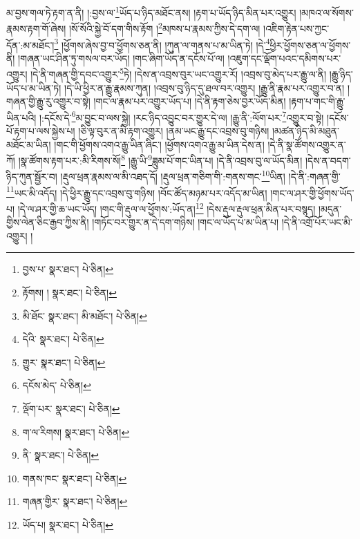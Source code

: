 མ་བྱས་གལ་ཏེ་རྟག་ན་ནི། །:བྱས་ལ་\footnote{བྱས་པ་  སྣར་ཐང་།  པེ་ཅིན། }ཡོད་པ་ཉིད་མཐོང་ནས། །རྟག་པ་ཡོད་ཉིད་མིན་པར་འགྱུར། །མཁའ་ལ་སོགས་རྣམས་རྟག་གོ་ཞེས། །སོ་སོའི་སྐྱེ་བོ་དག་གིས་རྟོག །\footnote{རྟོགས། །  སྣར་ཐང་།  པེ་ཅིན། }མཁས་པ་རྣམས་ཀྱིས་དེ་དག་ལ། །འཇིག་རྟེན་པས་ཀྱང་དོན་:མ་མཐོང་།\footnote{མི་ཐོང་  སྣར་ཐང་། མི་མཐོང་།  པེ་ཅིན། } །ཕྱོགས་ཞེས་བྱ་བ་ཕྱོགས་ཅན་ནི། །ཀུན་ལ་གནས་པ་མ་ཡིན་ཏེ། །དེ་\footnote{དེའི་  སྣར་ཐང་།  པེ་ཅིན། }ཕྱིར་ཕྱོགས་ཅན་ལ་ཕྱོགས་ནི། །གཞན་ཡང་ཤིན་ཏུ་གསལ་བར་ཡོད། །གང་ཞིག་ཡོད་ན་དངོས་པོ་ལ། །འཇུག་དང་ལྡོག་པའང་དམིགས་པར་འགྱུར། །དེ་ནི་གཞན་གྱི་དབང་འགྱུར་\footnote{གྱུར་  སྣར་ཐང་།  པེ་ཅིན། }ཏེ། །དེས་ན་འབྲས་བུར་ཡང་འགྱུར་རོ། །འབྲས་བུ་མེད་པར་རྒྱུ་ལ་ནི། །རྒྱུ་ཉིད་ཡོད་པ་མ་ཡིན་ཏེ། །དེ་ཡི་ཕྱིར་ན་རྒྱུ་རྣམས་ཀུན། །འབྲས་བུ་ཉིད་དུ་ཐལ་བར་འགྱུར། །རྒྱུ་ནི་རྣམ་པར་འགྱུར་བ་ན། །གཞན་གྱི་རྒྱུ་རུ་འགྱུར་བ་སྟེ། །གང་ལ་རྣམ་པར་འགྱུར་ཡོད་པ། །དེ་ནི་རྟག་ཅེས་བྱར་ཡོད་མིན། །རྟག་པ་གང་གི་རྒྱུ་ཡིན་པའི། །:དངོས་དེ་\footnote{དངོས་མེད་  པེ་ཅིན། }མ་བྱུང་བ་ལས་སྐྱེ། །རང་ཉིད་འབྱུང་བར་གྱུར་དེ་ལ། །རྒྱུ་ནི་:ལོག་པར་\footnote{ལྡོག་པར་  སྣར་ཐང་།  པེ་ཅིན། }འགྱུར་བ་སྟེ། །དངོས་པོ་རྟག་པ་ལས་སྐྱེས་པ། །ཅི་ལྟ་བུར་ན་མི་རྟག་འགྱུར། །ནམ་ཡང་རྒྱུ་དང་འབྲས་བུ་གཉིས། །མཚན་ཉིད་མི་མཐུན་མཐོང་མ་ཡིན། །གང་གི་ཕྱོགས་འགའ་རྒྱུ་ཡིན་ཞིང་། །ཕྱོགས་འགའ་རྒྱུ་མ་ཡིན་དེས་ན། །དེ་ནི་སྣ་ཚོགས་འགྱུར་ན་ཀོ། །སྣ་ཚོགས་རྟག་པར་:མི་རིགས་སོ།\footnote{ག་ལ་རིགས།  སྣར་ཐང་།  པེ་ཅིན། } །རྒྱུ་ཡི་\footnote{ནི་  སྣར་ཐང་།  པེ་ཅིན། }ཟླུམ་པོ་གང་ཡིན་པ། །དེ་ནི་འབྲས་བུ་ལ་ཡོད་མིན། །དེས་ན་བདག་ཉིད་ཀུན་སྦྱོར་བ། །རྡུལ་ཕྲན་རྣམས་ལ་མི་འཐད་དོ། །རྡུལ་ཕྲན་གཅིག་གི་:གནས་གང་\footnote{གནས་ཁང་  སྣར་ཐང་།  པེ་ཅིན། }ཡིན། །དེ་ནི་:གཞན་གྱི་\footnote{གཞན་གྱིར་  སྣར་ཐང་།  པེ་ཅིན། }ཡང་མི་འདོད། །དེ་ཕྱིར་རྒྱུ་དང་འབྲས་བུ་གཉིས། །བོང་ཚོད་མཉམ་པར་འདོད་མ་ཡིན། །གང་ལ་ཤར་གྱི་ཕྱོགས་ཡོད་པ། །དེ་ལ་ཤར་གྱི་ཆ་ཡང་ཡོད། །གང་གི་རྡུལ་ལ་ཕྱོགས་:ཡོད་ན།\footnote{ཡོད་པ།  སྣར་ཐང་།  པེ་ཅིན། } །དེས་རྡུལ་རྡུལ་ཕྲན་མིན་པར་བསྙད། །མདུན་གྱིས་ལེན་ཅིང་རྒྱབ་ཀྱིས་ནི། །གཏོང་བར་གྱུར་ན་དེ་དག་གཉིས། །གང་ལ་ཡོད་པ་མ་ཡིན་པ། །དེ་ནི་འགྲོ་པོར་ཡང་མི་འགྱུར། །
